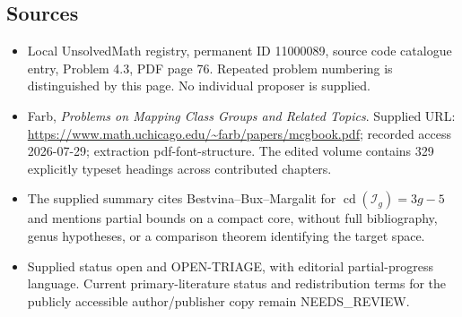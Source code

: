 \documentclass[11pt]{article}
\begin{document}
\subsection{Sources}
\begin{itemize}
\item Local UnsolvedMath registry, permanent ID 11000089, source code catalogue entry, Problem 4.3, PDF page 76. Repeated problem numbering is distinguished by this page. No individual proposer is supplied.
\item Farb, \emph{Problems on Mapping Class Groups and Related Topics}. Supplied URL: \url{https://www.math.uchicago.edu/~farb/papers/mcgbook.pdf}; recorded access 2026-07-29; extraction pdf-font-structure. The edited volume contains 329 explicitly typeset headings across contributed chapters.
\item The supplied summary cites Bestvina--Bux--Margalit for \(\operatorname{cd}(\mathcal I_g)=3g-5\) and mentions partial bounds on a compact core, without full bibliography, genus hypotheses, or a comparison theorem identifying the target space.
\item Supplied status open and OPEN-TRIAGE, with editorial partial-progress language. Current primary-literature status and redistribution terms for the publicly accessible author/publisher copy remain NEEDS\_REVIEW.
\end{itemize}
\end{document}
